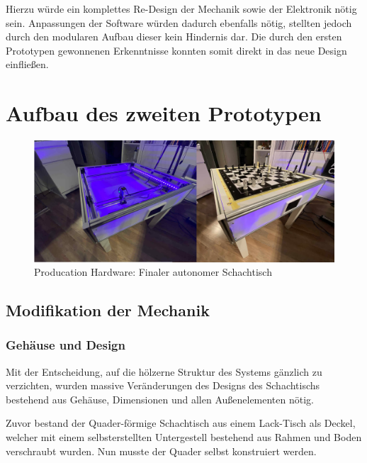Hierzu würde ein komplettes Re-Design der Mechanik sowie der Elektronik
nötig sein. Anpassungen der Software würden dadurch ebenfalls nötig,
stellten jedoch durch den modularen Aufbau dieser kein Hindernis dar.
Die durch den ersten Prototypen gewonnenen Erkenntnisse konnten somit
direkt in das neue Design einfließen.

\hypertarget{aufbau-des-zweiten-prototypen}{%
\chapter{Aufbau des zweiten
Prototypen}\label{aufbau-des-zweiten-prototypen}}

\begin{figure}
\centering
\includegraphics{images/table_images/prod.png}
\caption{Producation Hardware: Finaler autonomer Schachtisch
\label{prod}}
\end{figure}

\hypertarget{modifikation-der-mechanik}{%
\section{Modifikation der Mechanik}\label{modifikation-der-mechanik}}

\hypertarget{gehuxe4use-und-design}{%
\subsection{Gehäuse und Design}\label{gehuxe4use-und-design}}

Mit der Entscheidung, auf die hölzerne Struktur des Systems gänzlich zu
verzichten, wurden massive Veränderungen des Designs des Schachtischs
bestehend aus Gehäuse, Dimensionen und allen Außenelementen nötig.

Zuvor bestand der Quader-förmige Schachtisch aus einem Lack-Tisch als
Deckel, welcher mit einem selbsterstellten Untergestell bestehend aus
Rahmen und Boden verschraubt wurden. Nun musste der Quader selbst
konstruiert werden.

